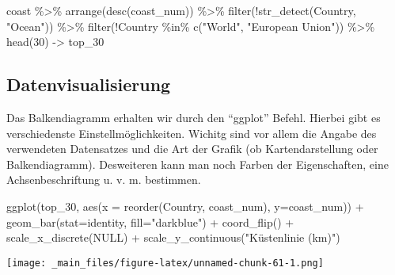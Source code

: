 \documentclass[11pt,german,a4paper]{article}
\newenvironment{Shaded}{\begin{snugshade}}{\end{snugshade}}
\newcommand{\AttributeTok}[1]{\textcolor[rgb]{0.77,0.63,0.00}{#1}}
\newcommand{\ConstantTok}[1]{\textcolor[rgb]{0.00,0.00,0.00}{#1}}
\newcommand{\DecValTok}[1]{\textcolor[rgb]{0.00,0.00,0.81}{#1}}
\newcommand{\FunctionTok}[1]{\textcolor[rgb]{0.00,0.00,0.00}{#1}}
\newcommand{\NormalTok}[1]{#1}
\newcommand{\OtherTok}[1]{\textcolor[rgb]{0.56,0.35,0.01}{#1}}
\newcommand{\SpecialCharTok}[1]{\textcolor[rgb]{0.00,0.00,0.00}{#1}}
\newcommand{\StringTok}[1]{\textcolor[rgb]{0.31,0.60,0.02}{#1}}
\begin{document}
\begin{Shaded}
\begin{Highlighting}[]
\NormalTok{coast }\SpecialCharTok{\%\textgreater{}\%}
  \FunctionTok{arrange}\NormalTok{(}\FunctionTok{desc}\NormalTok{(coast\_num)) }\SpecialCharTok{\%\textgreater{}\%}
  \FunctionTok{filter}\NormalTok{(}\SpecialCharTok{!}\FunctionTok{str\_detect}\NormalTok{(Country, }\StringTok{"Ocean"}\NormalTok{)) }\SpecialCharTok{\%\textgreater{}\%}
  \FunctionTok{filter}\NormalTok{(}\SpecialCharTok{!}\NormalTok{Country }\SpecialCharTok{\%in\%} \FunctionTok{c}\NormalTok{(}\StringTok{"World"}\NormalTok{, }\StringTok{"European Union"}\NormalTok{)) }\SpecialCharTok{\%\textgreater{}\%}
  \FunctionTok{head}\NormalTok{(}\DecValTok{30}\NormalTok{) }\OtherTok{{-}\textgreater{}}\NormalTok{ top\_30}
\end{Highlighting}
\end{Shaded}

\hypertarget{datenvisualisierung}{%
\subsection{Datenvisualisierung}\label{datenvisualisierung}}

Das Balkendiagramm erhalten wir durch den ``ggplot'' Befehl. Hierbei gibt es verschiedenste Einstellmöglichkeiten. Wichitg sind vor allem die Angabe des verwendeten Datensatzes und die Art der Grafik (ob Kartendarstellung oder Balkendiagramm). Desweiteren kann man noch Farben der Eigenschaften, eine Achsenbeschriftung u. v. m. bestimmen.

\begin{Shaded}
\begin{Highlighting}[]
\FunctionTok{ggplot}\NormalTok{(top\_30, }\FunctionTok{aes}\NormalTok{(}\AttributeTok{x =} \FunctionTok{reorder}\NormalTok{(Country, coast\_num), }\AttributeTok{y=}\NormalTok{coast\_num)) }\SpecialCharTok{+}
  \FunctionTok{geom\_bar}\NormalTok{(}\AttributeTok{stat=}\StringTok{\textquotesingle{}identity\textquotesingle{}}\NormalTok{, }\AttributeTok{fill=}\StringTok{"darkblue"}\NormalTok{) }\SpecialCharTok{+}
  \FunctionTok{coord\_flip}\NormalTok{() }\SpecialCharTok{+}
  \FunctionTok{scale\_x\_discrete}\NormalTok{(}\ConstantTok{NULL}\NormalTok{) }\SpecialCharTok{+}
  \FunctionTok{scale\_y\_continuous}\NormalTok{(}\StringTok{"Küstenlinie (km)"}\NormalTok{)}
\end{Highlighting}
\end{Shaded}

\texttt{[image: \_main\_files/figure-latex/unnamed-chunk-61-1.png]}
\end{document}
